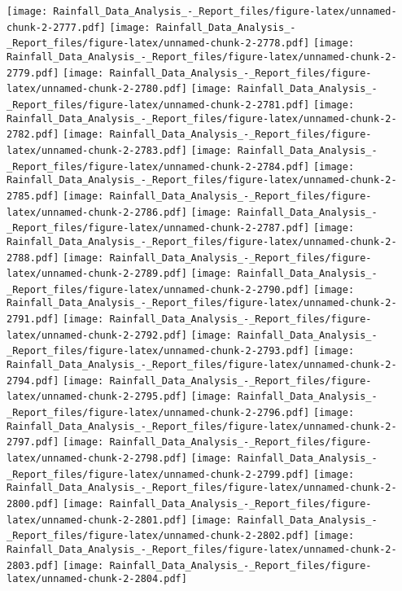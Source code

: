 \documentclass[
]{article}
\begin{document}
\texttt{[image: Rainfall\_Data\_Analysis\_-\_Report\_files/figure-latex/unnamed-chunk-2-2777.pdf]}
\texttt{[image: Rainfall\_Data\_Analysis\_-\_Report\_files/figure-latex/unnamed-chunk-2-2778.pdf]}
\texttt{[image: Rainfall\_Data\_Analysis\_-\_Report\_files/figure-latex/unnamed-chunk-2-2779.pdf]}
\texttt{[image: Rainfall\_Data\_Analysis\_-\_Report\_files/figure-latex/unnamed-chunk-2-2780.pdf]}
\texttt{[image: Rainfall\_Data\_Analysis\_-\_Report\_files/figure-latex/unnamed-chunk-2-2781.pdf]}
\texttt{[image: Rainfall\_Data\_Analysis\_-\_Report\_files/figure-latex/unnamed-chunk-2-2782.pdf]}
\texttt{[image: Rainfall\_Data\_Analysis\_-\_Report\_files/figure-latex/unnamed-chunk-2-2783.pdf]}
\texttt{[image: Rainfall\_Data\_Analysis\_-\_Report\_files/figure-latex/unnamed-chunk-2-2784.pdf]}
\texttt{[image: Rainfall\_Data\_Analysis\_-\_Report\_files/figure-latex/unnamed-chunk-2-2785.pdf]}
\texttt{[image: Rainfall\_Data\_Analysis\_-\_Report\_files/figure-latex/unnamed-chunk-2-2786.pdf]}
\texttt{[image: Rainfall\_Data\_Analysis\_-\_Report\_files/figure-latex/unnamed-chunk-2-2787.pdf]}
\texttt{[image: Rainfall\_Data\_Analysis\_-\_Report\_files/figure-latex/unnamed-chunk-2-2788.pdf]}
\texttt{[image: Rainfall\_Data\_Analysis\_-\_Report\_files/figure-latex/unnamed-chunk-2-2789.pdf]}
\texttt{[image: Rainfall\_Data\_Analysis\_-\_Report\_files/figure-latex/unnamed-chunk-2-2790.pdf]}
\texttt{[image: Rainfall\_Data\_Analysis\_-\_Report\_files/figure-latex/unnamed-chunk-2-2791.pdf]}
\texttt{[image: Rainfall\_Data\_Analysis\_-\_Report\_files/figure-latex/unnamed-chunk-2-2792.pdf]}
\texttt{[image: Rainfall\_Data\_Analysis\_-\_Report\_files/figure-latex/unnamed-chunk-2-2793.pdf]}
\texttt{[image: Rainfall\_Data\_Analysis\_-\_Report\_files/figure-latex/unnamed-chunk-2-2794.pdf]}
\texttt{[image: Rainfall\_Data\_Analysis\_-\_Report\_files/figure-latex/unnamed-chunk-2-2795.pdf]}
\texttt{[image: Rainfall\_Data\_Analysis\_-\_Report\_files/figure-latex/unnamed-chunk-2-2796.pdf]}
\texttt{[image: Rainfall\_Data\_Analysis\_-\_Report\_files/figure-latex/unnamed-chunk-2-2797.pdf]}
\texttt{[image: Rainfall\_Data\_Analysis\_-\_Report\_files/figure-latex/unnamed-chunk-2-2798.pdf]}
\texttt{[image: Rainfall\_Data\_Analysis\_-\_Report\_files/figure-latex/unnamed-chunk-2-2799.pdf]}
\texttt{[image: Rainfall\_Data\_Analysis\_-\_Report\_files/figure-latex/unnamed-chunk-2-2800.pdf]}
\texttt{[image: Rainfall\_Data\_Analysis\_-\_Report\_files/figure-latex/unnamed-chunk-2-2801.pdf]}
\texttt{[image: Rainfall\_Data\_Analysis\_-\_Report\_files/figure-latex/unnamed-chunk-2-2802.pdf]}
\texttt{[image: Rainfall\_Data\_Analysis\_-\_Report\_files/figure-latex/unnamed-chunk-2-2803.pdf]}
\texttt{[image: Rainfall\_Data\_Analysis\_-\_Report\_files/figure-latex/unnamed-chunk-2-2804.pdf]}
\end{document}

